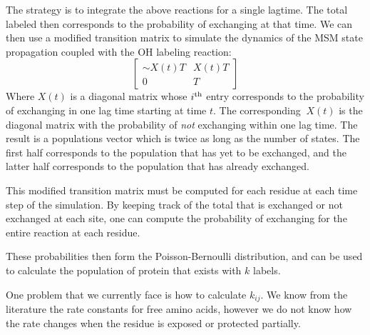 \documentclass[twocolumn,floatfix,nofootinbib,aps]{revtex4-1}
\begin{document}
The strategy is to integrate the above reactions for a single lagtime. The total labeled then corresponds to the probability of exchanging at that time. We can then use a modified transition matrix to simulate the dynamics of the MSM state propagation coupled with the OH labeling reaction:
$$\left[
\begin{array}{cc}
\sim X(t) T & X(t)T \\
0 & T 
\end{array}\right]$$ Where $X(t)$ is a diagonal matrix whose $i^\textnormal{th}$ entry corresponds to the probability of exchanging in one lag time starting at time $t$. The corresponding $~X(t)$ is the diagonal matrix with the probability of {\it not} exchanging within one lag time. The result is a populations vector which is twice as long as the number of states. The first half corresponds to the population that has yet to be exchanged, and the latter half corresponds to the population that has already exchanged.

This modified transition matrix must be computed for each residue at each time step of the simulation. By keeping track of the total that is exchanged or not exchanged at each site, one can compute the probability of exchanging for the entire reaction at each residue.

These probabilities then form the Poisson-Bernoulli distribution, and can be used to calculate the population of protein that exists with $k$ labels.

One problem that we currently face is how to calculate $k_{ij}$. We know from the literature the rate constants for free amino acids, however we do not know how the rate changes when the residue is exposed or protected partially.


\end{document}
